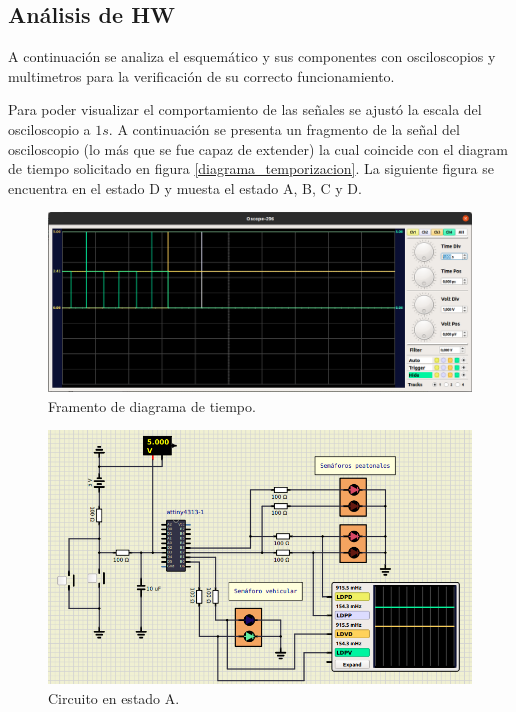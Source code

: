 \subsection{Análisis de HW}

A continuación se analiza el esquemático y sus componentes con osciloscopios y multimetros para la verificación de su correcto funcionamiento.


Para poder visualizar el comportamiento de las señales se ajustó la escala del osciloscopio a $1s$. A continuación se presenta un fragmento de la señal del osciloscopio (lo más que se fue capaz de extender) la cual coincide con  el diagram de tiempo solicitado en figura \ref{diagrama_temporizacion}. La siguiente figura se encuentra en el estado D y muesta el estado A, B, C y D.

\begin{figure}[H]
\centering
\includegraphics[scale=0.5]{./images/os.png} 
\caption{Framento de diagrama de tiempo.}
\label{f1}
\end{figure}

\begin{figure}[H]
\centering
\includegraphics[scale=0.8]{./images/A.png} 
\caption{Circuito en estado A.}
\label{f1}
\end{figure}


